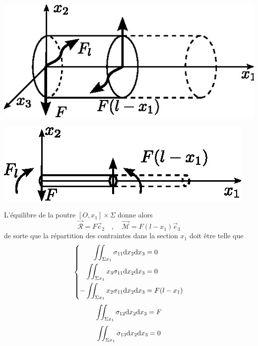 \begin{multicols}{2}
    \begin{center}
        \includegraphics{../images/T1_Ch07-19a}
    \end{center}
    \columnbreak
    \begin{center}
        \includegraphics{../images/T1_Ch07-19b}
    \end{center}
\end{multicols}
L'équilibre de la poutre $[O,x_1]\times \Sigma$ donne alors
\begin{displaymath}
    \vec{\mathcal{R}} = F \vec{e}_2 \quad,\quad \vec{\mathcal{M}} = F (l -x_1) \vec{e}_3
\end{displaymath}
de sorte que la répartition des contraintes dans la section $x_1$ doit être telle que
\begin{equation}
    \left\{
    \begin{aligned}
        \iint_{\Sigma x_1} \sigma_{11} \mathrm{d} x_2 \mathrm{d} x_3 &= 0 \\
        \iint_{\Sigma x_1} x_3\sigma_{11} \mathrm{d} x_2 \mathrm{d} x_3 &= 0 \\
        -\iint_{\Sigma x_1} x_2\sigma_{11} \mathrm{d} x_2 \mathrm{d} x_3 &= F (l-x_1)
    \end{aligned}
    \right.
    \label{eq:Ch07-092}
\end{equation}
\begin{equation}
    \iint_{\Sigma x_1} \sigma_{12} \mathrm{d} x_2 \mathrm{d} x_3 = F
    \label{eq:Ch07-093}
\end{equation}
\begin{equation}
    \iint_{\Sigma x_1} \sigma_{13} \mathrm{d} x_2 \mathrm{d} x_3 = 0
    \label{eq:Ch07-094}
\end{equation}
